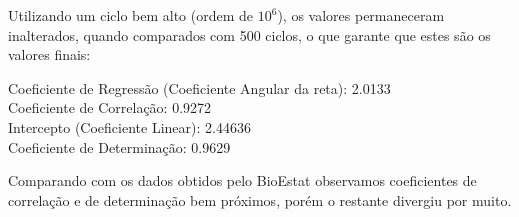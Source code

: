 Utilizando um ciclo bem alto (ordem de $10^6$), os valores permaneceram inalterados, quando comparados com 500 ciclos, o que garante que estes são os valores finais:

Coeficiente de Regressão (Coeficiente Angular da reta): 2.0133\\
Coeficiente de Correlação: 0.9272\\
Intercepto (Coeficiente Linear): 2.44636\\
Coeficiente de Determinação: 0.9629

Comparando com os dados obtidos pelo BioEstat observamos coeficientes de correlação e 
de determinação bem próximos, porém o restante divergiu por muito.
